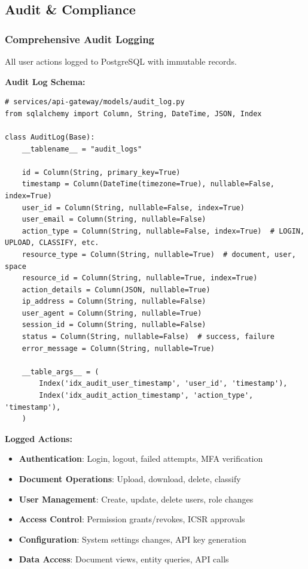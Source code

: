 \subsection{Audit \& Compliance}

\subsubsection{Comprehensive Audit Logging}

All user actions logged to PostgreSQL with immutable records.

\textbf{Audit Log Schema:}
\begin{lstlisting}[style=pythonstyle]
# services/api-gateway/models/audit_log.py
from sqlalchemy import Column, String, DateTime, JSON, Index

class AuditLog(Base):
    __tablename__ = "audit_logs"
    
    id = Column(String, primary_key=True)
    timestamp = Column(DateTime(timezone=True), nullable=False, index=True)
    user_id = Column(String, nullable=False, index=True)
    user_email = Column(String, nullable=False)
    action_type = Column(String, nullable=False, index=True)  # LOGIN, UPLOAD, CLASSIFY, etc.
    resource_type = Column(String, nullable=True)  # document, user, space
    resource_id = Column(String, nullable=True, index=True)
    action_details = Column(JSON, nullable=True)
    ip_address = Column(String, nullable=False)
    user_agent = Column(String, nullable=True)
    session_id = Column(String, nullable=False)
    status = Column(String, nullable=False)  # success, failure
    error_message = Column(String, nullable=True)
    
    __table_args__ = (
        Index('idx_audit_user_timestamp', 'user_id', 'timestamp'),
        Index('idx_audit_action_timestamp', 'action_type', 'timestamp'),
    )
\end{lstlisting}

\textbf{Logged Actions:}
\begin{itemize}
    \item \textbf{Authentication}: Login, logout, failed attempts, MFA verification
    \item \textbf{Document Operations}: Upload, download, delete, classify
    \item \textbf{User Management}: Create, update, delete users, role changes
    \item \textbf{Access Control}: Permission grants/revokes, ICSR approvals
    \item \textbf{Configuration}: System settings changes, API key generation
    \item \textbf{Data Access}: Document views, entity queries, API calls
\end{itemize}

